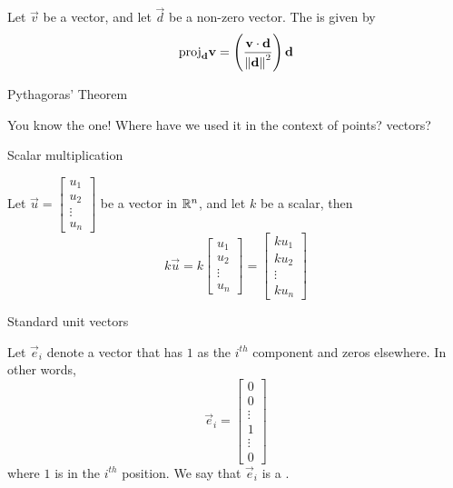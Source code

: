 \documentclass{ximera}
\begin{document}
\begin{expandable}{}{}
    Let $\vec{v}$ be a vector, and let $\vec{d}$ be a non-zero vector.  The  is given by 
$$\mbox{proj}_{\mathbf{d}}\mathbf{v}=\left(\frac{\mathbf{v}\cdot\mathbf{d}}{\left\lVert\mathbf{d}\right\rVert^2}\right)\mathbf{d}$$
\end{expandable}


Pythagoras’ Theorem
\begin{expandable}{}{}
    You know the one!  Where have we used it in the context of points? vectors?
\end{expandable}


Scalar multiplication 

\begin{expandable}{}{}
    Let $\vec{u}=\begin{bmatrix}
u_1\\
u_2\\
\vdots\\
u_n
\end{bmatrix}$ be a vector in $\mathbb{R}^n$, and let $k$ be a scalar, then
  $$k\vec{u}=k\begin{bmatrix}
u_1\\
u_2\\
\vdots\\
u_n
\end{bmatrix}=\begin{bmatrix}
ku_1\\
ku_2\\
\vdots\\
ku_n
\end{bmatrix}$$
\end{expandable}


Standard unit vectors

\begin{expandable}{}{}
  Let $\vec{e}_i$ denote a vector that has $1$ as the $i^{th}$ component and zeros elsewhere.  In other words, $$\vec{e}_i=\begin{bmatrix}
0\\
0\\
\vdots\\
1\\
\vdots\\
0
\end{bmatrix}$$ 
  where $1$ is in the $i^{th}$ position.  We say that  $\vec{e}_i$ is a .
\end{expandable}
\end{document}
